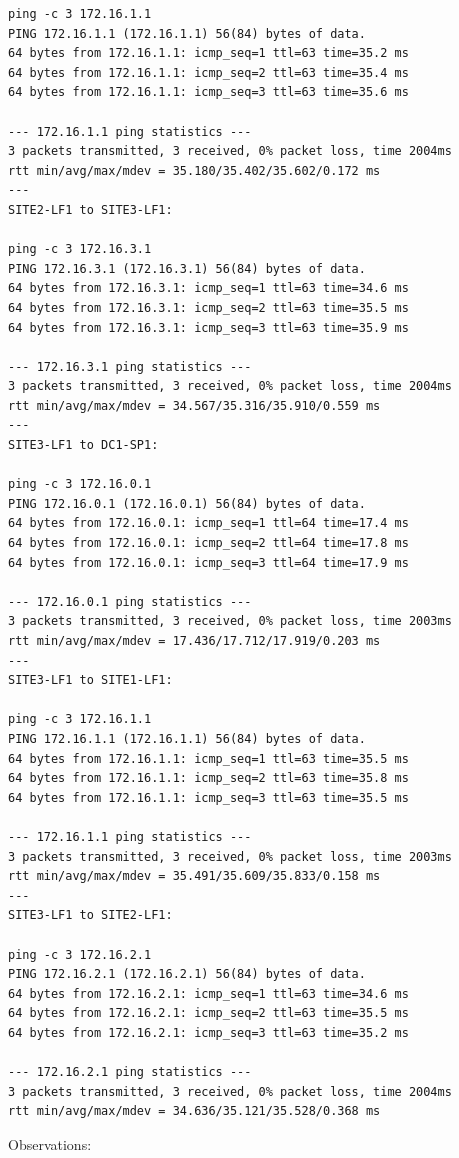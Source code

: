 \documentclass[11pt]{article}
\begin{document}
\begin{verbatim}
ping -c 3 172.16.1.1
PING 172.16.1.1 (172.16.1.1) 56(84) bytes of data.
64 bytes from 172.16.1.1: icmp_seq=1 ttl=63 time=35.2 ms
64 bytes from 172.16.1.1: icmp_seq=2 ttl=63 time=35.4 ms
64 bytes from 172.16.1.1: icmp_seq=3 ttl=63 time=35.6 ms

--- 172.16.1.1 ping statistics ---
3 packets transmitted, 3 received, 0% packet loss, time 2004ms
rtt min/avg/max/mdev = 35.180/35.402/35.602/0.172 ms
---
SITE2-LF1 to SITE3-LF1:

ping -c 3 172.16.3.1
PING 172.16.3.1 (172.16.3.1) 56(84) bytes of data.
64 bytes from 172.16.3.1: icmp_seq=1 ttl=63 time=34.6 ms
64 bytes from 172.16.3.1: icmp_seq=2 ttl=63 time=35.5 ms
64 bytes from 172.16.3.1: icmp_seq=3 ttl=63 time=35.9 ms

--- 172.16.3.1 ping statistics ---
3 packets transmitted, 3 received, 0% packet loss, time 2004ms
rtt min/avg/max/mdev = 34.567/35.316/35.910/0.559 ms
---
SITE3-LF1 to DC1-SP1:

ping -c 3 172.16.0.1
PING 172.16.0.1 (172.16.0.1) 56(84) bytes of data.
64 bytes from 172.16.0.1: icmp_seq=1 ttl=64 time=17.4 ms
64 bytes from 172.16.0.1: icmp_seq=2 ttl=64 time=17.8 ms
64 bytes from 172.16.0.1: icmp_seq=3 ttl=64 time=17.9 ms

--- 172.16.0.1 ping statistics ---
3 packets transmitted, 3 received, 0% packet loss, time 2003ms
rtt min/avg/max/mdev = 17.436/17.712/17.919/0.203 ms
---
SITE3-LF1 to SITE1-LF1:

ping -c 3 172.16.1.1
PING 172.16.1.1 (172.16.1.1) 56(84) bytes of data.
64 bytes from 172.16.1.1: icmp_seq=1 ttl=63 time=35.5 ms
64 bytes from 172.16.1.1: icmp_seq=2 ttl=63 time=35.8 ms
64 bytes from 172.16.1.1: icmp_seq=3 ttl=63 time=35.5 ms

--- 172.16.1.1 ping statistics ---
3 packets transmitted, 3 received, 0% packet loss, time 2003ms
rtt min/avg/max/mdev = 35.491/35.609/35.833/0.158 ms
---
SITE3-LF1 to SITE2-LF1:

ping -c 3 172.16.2.1
PING 172.16.2.1 (172.16.2.1) 56(84) bytes of data.
64 bytes from 172.16.2.1: icmp_seq=1 ttl=63 time=34.6 ms
64 bytes from 172.16.2.1: icmp_seq=2 ttl=63 time=35.5 ms
64 bytes from 172.16.2.1: icmp_seq=3 ttl=63 time=35.2 ms

--- 172.16.2.1 ping statistics ---
3 packets transmitted, 3 received, 0% packet loss, time 2004ms
rtt min/avg/max/mdev = 34.636/35.121/35.528/0.368 ms
\end{verbatim}

Observations:
\end{document}
